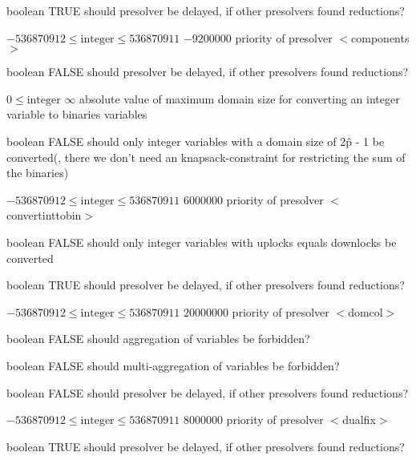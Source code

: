 %
{boolean}%
{TRUE}%
{should presolver be delayed, if other presolvers found reductions?}%
{}

%
{$-536870912\leq\textrm{integer}\leq536870911$}%
{$-9200000$}%
{priority of presolver $<$components$>$}%
{}

%
{boolean}%
{FALSE}%
{should presolver be delayed, if other presolvers found reductions?}%
{}

%
{$0\leq\textrm{integer}$}%
{$\infty$}%
{absolute value of maximum domain size for converting an integer variable to binaries variables}%
{}

%
{boolean}%
{FALSE}%
{should only integer variables with a domain size of 2\^p - 1 be converted(, there we don't need an knapsack-constraint for restricting the sum of the binaries)}%
{}

%
{$-536870912\leq\textrm{integer}\leq536870911$}%
{$6000000$}%
{priority of presolver $<$convertinttobin$>$}%
{}

%
{boolean}%
{FALSE}%
{should only integer variables with uplocks equals downlocks be converted}%
{}

%
{boolean}%
{TRUE}%
{should presolver be delayed, if other presolvers found reductions?}%
{}

%
{$-536870912\leq\textrm{integer}\leq536870911$}%
{$20000000$}%
{priority of presolver $<$domcol$>$}%
{}

%
{boolean}%
{FALSE}%
{should aggregation of variables be forbidden?}%
{}

%
{boolean}%
{FALSE}%
{should multi-aggregation of variables be forbidden?}%
{}

%
{boolean}%
{FALSE}%
{should presolver be delayed, if other presolvers found reductions?}%
{}

%
{$-536870912\leq\textrm{integer}\leq536870911$}%
{$8000000$}%
{priority of presolver $<$dualfix$>$}%
{}

%
{boolean}%
{TRUE}%
{should presolver be delayed, if other presolvers found reductions?}%
{}

